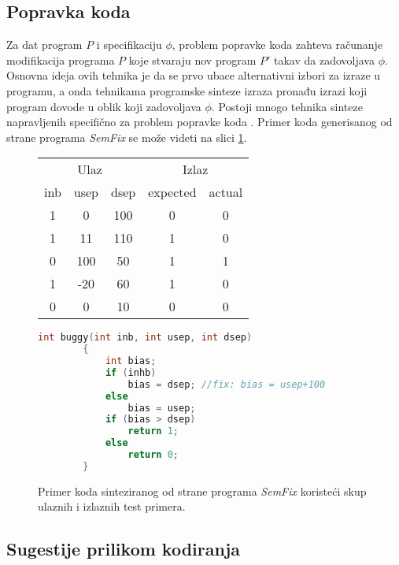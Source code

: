 \subsection{Popravka koda}
\label{subsec:PopravkaKoda}

Za dat program $P$ i specifikaciju $\phi$, problem popravke koda zahteva ra\-ču\-na\-nje modifikacija programa $P$ koje stvaraju nov program $P'$ takav da zadovoljava $\phi$. Osnovna ideja ovih tehnika je da se prvo ubace alternativni izbori za izraze u programu, a onda tehnikama programske sinteze izraza pronađu izrazi koji program dovode u oblik koji zadovoljava $\phi$. Postoji mnogo tehnika sinteze napravljenih specifično za problem popravke koda \cite{Qlose, ProgramRepairAsAGame}. Primer koda generisanog od strane programa \emph{SemFix} \cite{SemFix} se može videti na slici \ref{fig:CodeRepair}.

\begin{figure}[!h]
    \centering
    \begin{tabular}{ccc|cc}
        \multicolumn{3}{c|}{Ulaz} & \multicolumn{2}{c}{Izlaz}\\
        inb & usep & dsep & expected & actual \\
        \hline
        1 & 0 & 100 & 0 & 0 \\
        1 & 11 & 110 & 1 & 0 \\
        0 & 100 & 50 & 1 & 1 \\
        1 & -20 & 60 & 1 & 0 \\
        0 & 0 & 10 & 0 & 0 \\
    \end{tabular}

    \centering
    \begin{lstlisting}[language=C]
        int buggy(int inb, int usep, int dsep)
        {
            int bias;
            if (inhb)
                bias = dsep; //fix: bias = usep+100
            else
                bias = usep;
            if (bias > dsep)
                return 1;
            else
                return 0;
        }
    \end{lstlisting}

    \caption{Primer koda sinteziranog od strane programa \emph{SemFix} \cite{SemFix} koristeći skup ulaznih i izlaznih test primera.}
    \label{fig:CodeRepair}
\end{figure}

\subsection{Sugestije prilikom kodiranja}
\label{subsec:SugestijePrilikomKodiranja}


